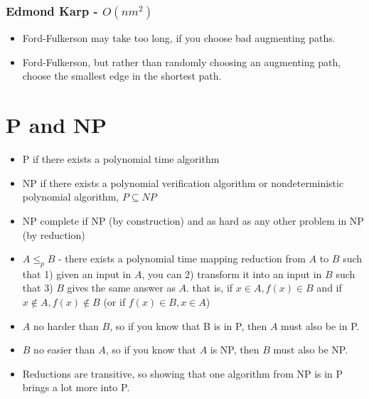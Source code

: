 \subsubsection{Edmond Karp - $O(nm^2)$}
\begin{itemize}
    \item Ford-Fulkerson may take too long, if you choose bad augmenting paths.
    \item Ford-Fulkerson, but rather than randomly choosing an augmenting path, choose the smallest edge in the shortest path.
\end{itemize}

\section{P and NP}
\begin{itemize}
    \item P if there exists a polynomial time algorithm
    \item NP if there exists a polynomial verification algorithm or nondeterministic polynomial algorithm, $P \subseteq NP$
    \item NP complete if NP (by construction) and as hard as any other problem in NP (by reduction)
    \item $A\leq_p B$ - there exists a polynomial time mapping reduction from $A$ to $B$ such that 1) given an input in $A$, you can 2) transform it into an input in $B$ such that 3) $B$ gives the same answer as $A$. that is, if $x \in A, f(x) \in B$ and if $x \notin A, f(x) \notin B$ (or if $f(x) \in B, x \in A$)
    \item $A$ no harder than $B$, so if you know that B is in P, then $A$ must also be in P.
    \item $B$ no easier than $A$, so if you know that $A$ is NP, then $B$ must also be NP.
    \item Reductions are transitive, so showing that one algorithm from NP is in P brings a lot more into P.
\end{itemize}
